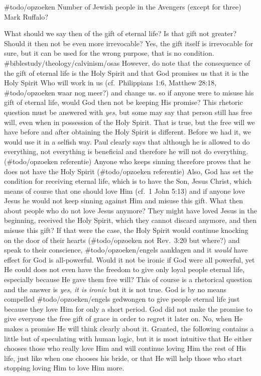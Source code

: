 \#todo/opzoeken Number of Jewish people in the Avengers (except for
three) Mark Ruffalo?

What should we say then of the gift of eternal life? Is that gift not
greater? Should it then not be even more irrevocable? Yes, the gift
itself is irrevocable for sure, but it can be used for the wrong
purpose, that is no condition. \#biblestudy/theology/calvinism/osas
However, do note that the consequence of the gift of eternal life is the
Holy Spirit and that God promises us that it is the Holy Spirit Who will
work in us (cf.~Philippians 1:6, Matthew 28:18, \#todo/opzoeken waar nog
meer?) and change us. so if anyone were to misuse his gift of eternal
life, would God then not be keeping His promise? This rhetoric question
must be answered with \emph{yes}, but some may say that person still has
free will, even when in possession of the Holy Spirit. That is true, but
the free will we have before and after obtaining the Holy Spirit is
different. Before we had it, we would use it in a selfish way. Paul
clearly says that although he is allowed to do everything, not
everything is beneficial and therefore he will not do everything.
(\#todo/opzoeken referentie) Anyone who keeps sinning therefore proves
that he does not have the Holy Spirit (\#todo/opzoeken referentie) Also,
God has set the condition for receiving eternal life, which is to have
the Son, Jesus Christ, which means of course that one should love Him
(cf.~1 John 5:13) and if anyone love Jesus he would not keep sinning
against Him and misuse this gift. What then about people who do not love
Jesus anymore? They might have loved Jesus in the beginning, received
the Holy Spirit, which they cannot discard anymore, and then misuse this
gift? If that were the case, the Holy Spirit would continue knocking on
the door of their hearts (\#todo/opzoeken not Rev.~3:20 but where?) and
speak to their conscience, \#todo/opzoeken/engels aanklagen and it
\emph{would} have effect for God is all-powerful. Would it not be ironic
if God were all powerful, yet He could does not even have the freedom to
give only loyal people eternal life, especially because He gave them
free will? This of course is a rhetorical question and the answer is
\emph{yes, it is ironic} but it is not true. God is by no means
compelled \#todo/opzoeken/engels gedwongen to give people eternal life
just because they love Him for only a short period. God did not make the
promise to give everyone the free gift of grace in order to regret it
later on. No, when He makes a promise He will think clearly about it.
Granted, the following contains a little but of speculating with human
logic, but it is most intuitive that He either chooses those who really
love Him and will continue loving Him the rest of His life, just like
when one chooses his bride, or that He will help those who start
stopping loving Him to love Him more.


